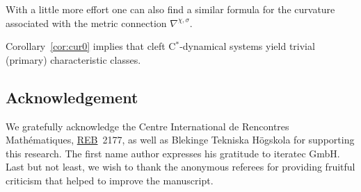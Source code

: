 \documentclass[10pt,a4paper]{amsart}
\numberwithin{equation}{section}
\newcommand*{\Star}{$^*$\nobreakdash}
\begin{document}
\begin{Remark} With a little more effort one can also find a similar formula for the curvature associated with the metric connection $\nabla^{\chi,\sigma}$.
\end{Remark}

\begin{Remark}
	Corollary~\ref{cor:cur0} implies that cleft C\Star-dynamical systems yield trivial (primary) characteristic classes.
\end{Remark}

\subsection*{Acknowledgement}

We gratefully acknowledge the Centre International de Rencontres Math\'ematiques, \href{https://conferences.cirm-math.fr/2177}{REB}~2177, as well as Blekinge Tekniska H\"ogskola for supporting this research.
The first name author expresses his gratitude to iteratec GmbH.
Last but not least, we wish to thank the anonymous referees for providing fruitful criticism that helped to improve the manuscript.

\end{document}
